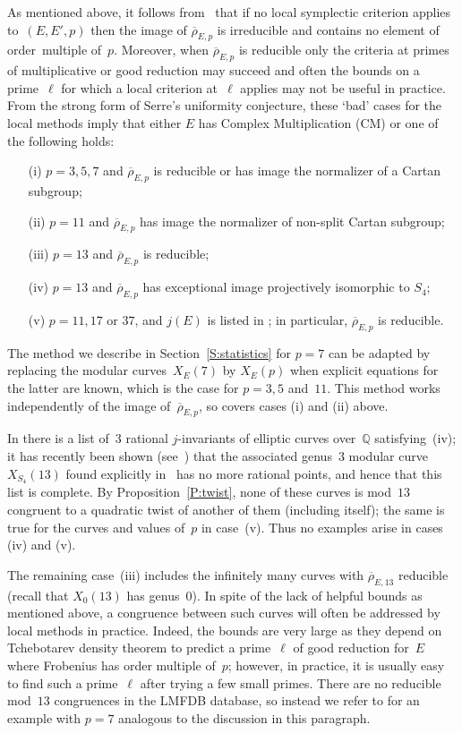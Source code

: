 \documentclass[12pt, reqno]{amsart}
\newcommand{\Q}{\mathbb{Q}}
\newcommand{\rhobar}{{\overline{\rho}}}
\numberwithin{equation}{section}
\theoremstyle{definition}
\theoremstyle{remark}
\begin{document}
As mentioned above, it follows from~\cite{FKSym} that if no local
symplectic criterion applies to~$(E,E',p)$ then the image of
$\rhobar_{E,p}$ is irreducible and contains no element of
order~multiple of~$p$. Moreover, when $\rhobar_{E,p}$ is reducible
only the criteria at primes of multiplicative or good reduction may
succeed and often the bounds on a prime~$\ell$ for which a local
criterion at~$\ell$ applies may not be useful in practice.  From the
strong form of Serre's uniformity conjecture, these `bad' cases for
the local methods imply that either $E$ has Complex Multiplication
(CM) or one of the following holds:
\begin{itemize}
 \item[(i)] $p=3,5,7$ and $\rhobar_{E,p}$ is reducible or has image the normalizer of a Cartan subgroup;
 \item[(ii)] $p=11$ and $\rhobar_{E,p}$ has image the normalizer of non-split Cartan subgroup;
 \item[(iii)] $p=13$ and $\rhobar_{E,p}$ is reducible; 
 \item[(iv)] $p=13$ and $\rhobar_{E,p}$ has exceptional image projectively isomorphic to $S_4$;
 \item[(v)] $p=11,17$ or $37$, and $j(E)$ is listed
 in \cite[Table~2.1]{DahmenPhD}; in particular, $\rhobar_{E,p}$ is reducible.
\end{itemize}
The method we describe in Section~\ref{S:statistics} for $p=7$ can be
adapted by replacing the modular curves~$X_E(7)$ by $X_E(p)$ when
explicit equations for the latter are known, which is the case for
$p=3,5$ and~$11$. This method works independently of the image
of~$\rhobar_{E,p}$, so covers cases (i) and (ii) above.

In \cite[Corollary~1.9]{BarinderCrem} there is a list of~$3$ rational
$j$-invariants of elliptic curves over~$\Q$ satisfying~(iv); it has
recently been shown (see~\cite{BDMTV-S4}) that the associated
genus~$3$ modular curve~$X_{S_4}(13)$ found explicitly
in~\cite{BarinderCrem} has no more rational points, and hence that
this list is complete. By Proposition~\ref{P:twist}, none of these
curves is mod~$13$ congruent to a quadratic twist of another of them
(including itself); the same is true for the curves and values of~$p$
in case~(v). Thus no examples arise in cases (iv) and (v).

The remaining case~(iii) includes the infinitely many curves with
$\rhobar_{E,13}$ reducible (recall that $X_0(13)$ has genus~0). In
spite of the lack of helpful bounds as mentioned above, a congruence
between such curves will often be addressed by local methods in
practice. Indeed, the bounds are very large as they depend on
Tchebotarev density theorem to predict a prime~$\ell$ of good
reduction for~$E$ where Frobenius has order multiple of~$p$; however,
in practice, it is usually easy to find such a prime~$\ell$ after
trying a few small primes.  There are no reducible mod~$13$ congruences in the LMFDB database, so instead we refer to \cite[Example~31.2]{FKSym} for
an example with $p=7$ analogous to the discussion in this paragraph.
\end{document}
